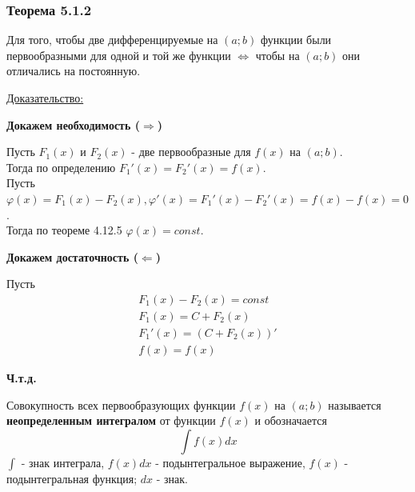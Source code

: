 \documentclass[12pt]{article}
\begin{document}
    \subsubsection*{Теорема 5.1.2}\label{th:5.1.2}
    Для того, чтобы две дифференцируемые на $(a;b)$ функции были первообразными для одной и той же функции $\Longleftrightarrow$ чтобы на $(a; b)$ они отличались на постоянную.\par\noindent
    \underline{Доказательство:}
    \begin{adjustwidth}{1.5em}{1.5em}
        \textbf{Докажем необходимость ($\Rightarrow$)}\par\noindent
        Пусть $F_1(x)$ и $F_2(x)$ - две первообразные для $f(x)$ на $(a; b)$.\\
        Тогда по определению $F_1'(x) = F_2'(x) = f(x)$.\\
        Пусть $\varphi(x) = F_1(x) - F_2(x), \varphi'(x) = F_1'(x) - F_2'(x) = f(x) - f(x) = 0$.\\
        Тогда по теореме 4.12.5 $\varphi(x) = const$.\par\noindent
        \textbf{Докажем достаточность ($\Leftarrow$)}\par\noindent
        Пусть
        \begin{gather*}
            F_1(x) - F_2(x) = const\\
            F_1(x) = C + F_2(x)\\
            F_1'(x) = (C + F_2(x))'\\
            f(x) = f(x)
        \end{gather*}
        \begin{center}
            \textbf{Ч.т.д.}
        \end{center}
    \end{adjustwidth}
    Совокупность всех первообразующих функции $f(x)$ на $(a; b)$ называется \textbf{неопределенным интегралом} от функции $f(x)$ и обозначается 
    \[ \int f(x)dx \]
    $\int$ - знак интеграла, $f(x)dx$ - подынтегральное выражение, $f(x)$ - подынтегральная функция; $dx$ - знак.
    
\end{document}
